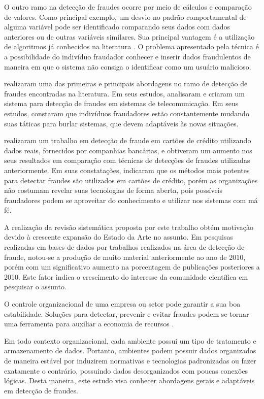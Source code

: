 \documentclass[smallextended]{svjour3}       %
\begin{document}
O outro ramo na detecção de fraudes ocorre por meio de cálculos e comparação de valores. Como principal exemplo, um desvio no padrão comportamental de alguma variável pode ser identificado comparando seus dados com dados anteriores ou de outras variáveis similares. Sua principal vantagem é a utilização de algoritmos já conhecidos na literatura \citep{Fawcett1997}. O problema apresentado pela técnica é a possibilidade do indivíduo fraudador conhecer e inserir dados fraudulentos de maneira em que o sistema não consiga o identificar como um usuário malicioso.

\cite{Fawcett1997} realizaram uma das primeiras e principais abordagens no ramo de detecção de fraudes encontradas na literatura. Em seus estudos, analisaram e criaram um sistema para detecção de fraudes em sistemas de telecomunicação. Em seus estudos, constaram que indivíduos fraudadores estão constantemente mudando suas táticas para burlar sistemas, que devem adaptáveis às novas situações.

\cite{809570} realizaram um trabalho em detecção de fraude em cartões de crédito utilizando dados reais, fornecidos por companhias bancárias, e obtiveram um aumento nos seus resultados em comparação com técnicas de detecções de fraudes utilizadas anteriormente. Em suas constatações, indicaram que os métodos mais potentes para detectar fraudes são utilizados em cartões de crédito, porém as organizações não costumam revelar suas tecnologias de forma aberta, pois possíveis fraudadores podem se aproveitar do conhecimento e utilizar nos sistemas com má fé.

A realização da revisão sistemática proposta por este trabalho obtém motivação devido à crescente expansão do Estado da Arte no assunto. Em pesquisas realizadas em bases de dados por trabalhos realizados na área de detecção de fraude, notou-se a produção de muito material anteriormente ao ano de 2010, porém com um significativo aumento na porcentagem de publicações posteriores a 2010. Este fator indica o crescimento do interesse da comunidade científica em pesquisar o assunto.

O controle organizacional de uma empresa ou setor pode garantir a sua boa estabilidade. Soluções para detectar, prevenir e evitar fraudes podem se tornar uma ferramenta para auxiliar a economia de recursos \citep{809570}. 

Em todo contexto organizacional, cada ambiente possui um tipo de tratamento e armazenamento de dados. Portanto, ambientes podem possuir dados organizados de maneira estável por induzirem normativas e tecnologias padronizadas ou fazer exatamente o contrário, possuindo dados desorganizados com poucas conexões lógicas. Desta maneira, este estudo visa conhecer abordagens gerais e adaptáveis em detecção de fraudes.
\end{document}
